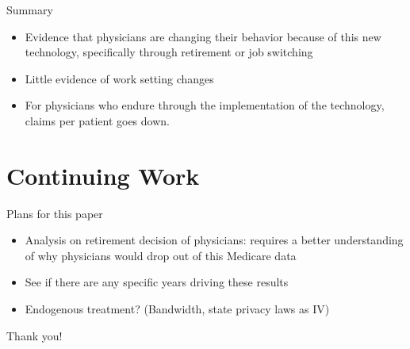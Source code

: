 \documentclass[10pt]{beamer}
\begin{document}
\begin{frame}{Summary}
\begin{itemize}
    \item Evidence that physicians are changing their behavior because of this new technology, specifically through retirement or job switching
    \item Little evidence of work setting changes
    \item For physicians who endure through the implementation of the technology, claims per patient goes down. 
    
\end{itemize}
\end{frame}







\section{Continuing Work}

\begin{frame}{Plans for this paper}
    \begin{itemize}
        \item Analysis on retirement decision of physicians: requires a better understanding of why physicians would drop out of this Medicare data
        \item See if there are any specific years driving these results
        \item Endogenous treatment? (Bandwidth, state privacy laws as IV)
    \end{itemize}
\end{frame}

\begin{frame}[plain]{}
\centering
    Thank you!
\end{frame}
\end{document}
